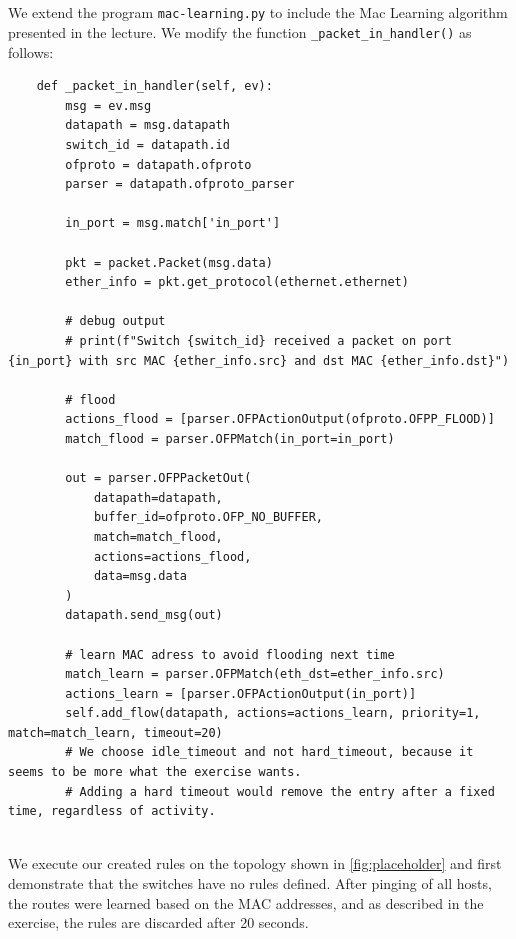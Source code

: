 \documentclass{article}
\begin{document}
    \subsection{}

    We extend the program \texttt{mac-learning.py} to include the Mac Learning algorithm presented in the lecture. We modify the function \texttt{\_packet\_in\_handler()} as follows:
    
    \begin{verbatim}
    def _packet_in_handler(self, ev):
        msg = ev.msg
        datapath = msg.datapath
        switch_id = datapath.id
        ofproto = datapath.ofproto
        parser = datapath.ofproto_parser

        in_port = msg.match['in_port']

        pkt = packet.Packet(msg.data)
        ether_info = pkt.get_protocol(ethernet.ethernet)

        # debug output
        # print(f"Switch {switch_id} received a packet on port {in_port} with src MAC {ether_info.src} and dst MAC {ether_info.dst}")

        # flood
        actions_flood = [parser.OFPActionOutput(ofproto.OFPP_FLOOD)]
        match_flood = parser.OFPMatch(in_port=in_port)

        out = parser.OFPPacketOut(
            datapath=datapath,
            buffer_id=ofproto.OFP_NO_BUFFER,
            match=match_flood,
            actions=actions_flood,
            data=msg.data
        )
        datapath.send_msg(out)

        # learn MAC adress to avoid flooding next time
        match_learn = parser.OFPMatch(eth_dst=ether_info.src)
        actions_learn = [parser.OFPActionOutput(in_port)]
        self.add_flow(datapath, actions=actions_learn, priority=1, match=match_learn, timeout=20)
        # We choose idle_timeout and not hard_timeout, because it seems to be more what the exercise wants.
        # Adding a hard timeout would remove the entry after a fixed time, regardless of activity.
        
    \end{verbatim}

    
    We execute our created rules on the topology shown in \ref{fig:placeholder} and first demonstrate that the switches have no rules defined. After pinging of all hosts, the routes were learned based on the MAC addresses, and as described in the exercise, the rules are discarded after 20 seconds.
\end{document}
